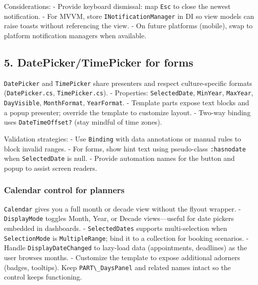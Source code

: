 Considerations: - Provide keyboard dismissal: map
\passthrough{\lstinline!Esc!} to close the newest notification. - For
MVVM, store \passthrough{\lstinline!INotificationManager!} in DI so view
models can raise toasts without referencing the view. - On future
platforms (mobile), swap to platform notification managers when
available.

\subsection{5. DatePicker/TimePicker for
forms}\label{datepickertimepicker-for-forms}

\passthrough{\lstinline!DatePicker!} and
\passthrough{\lstinline!TimePicker!} share presenters and respect
culture-specific formats (\passthrough{\lstinline!DatePicker.cs!},
\passthrough{\lstinline!TimePicker.cs!}). - Properties:
\passthrough{\lstinline!SelectedDate!},
\passthrough{\lstinline!MinYear!}, \passthrough{\lstinline!MaxYear!},
\passthrough{\lstinline!DayVisible!},
\passthrough{\lstinline!MonthFormat!},
\passthrough{\lstinline!YearFormat!}. - Template parts expose text
blocks and a popup presenter; override the template to customize layout.
- Two-way binding uses \passthrough{\lstinline!DateTimeOffset?!} (stay
mindful of time zones).

Validation strategies: - Use \passthrough{\lstinline!Binding!} with data
annotations or manual rules to block invalid ranges. - For forms, show
hint text using pseudo-class \passthrough{\lstinline!:hasnodate!} when
\passthrough{\lstinline!SelectedDate!} is null. - Provide automation
names for the button and popup to assist screen readers.

\subsubsection{Calendar control for
planners}\label{calendar-control-for-planners}

\passthrough{\lstinline!Calendar!} gives you a full month or decade view
without the flyout wrapper. - \passthrough{\lstinline!DisplayMode!}
toggles Month, Year, or Decade views---useful for date pickers embedded
in dashboards. - \passthrough{\lstinline!SelectedDates!} supports
multi-selection when \passthrough{\lstinline!SelectionMode!} is
\passthrough{\lstinline!MultipleRange!}; bind it to a collection for
booking scenarios. - Handle \passthrough{\lstinline!DisplayDateChanged!}
to lazy-load data (appointments, deadlines) as the user browses months.
- Customize the template to expose additional adorners (badges,
tooltips). Keep \passthrough{\lstinline!PART\_DaysPanel!} and related
names intact so the control keeps functioning.

